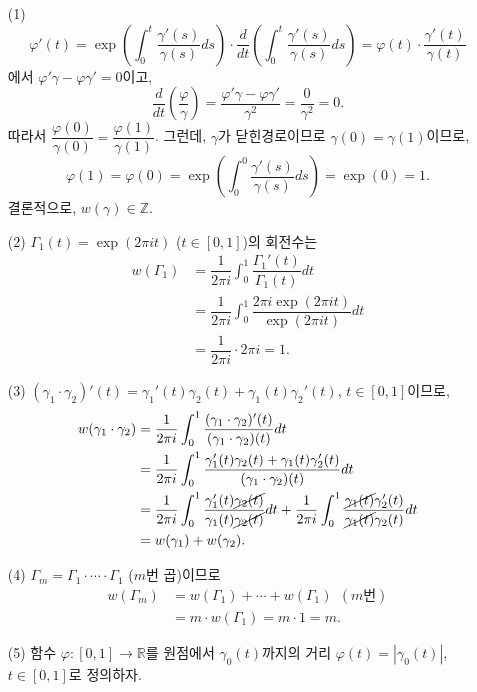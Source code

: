 \begin{itemize}
\item[(1)] 
\[
\varphi'(t) = \exp\left( \int_0^t \dfrac{\gamma'(s)}{\gamma(s)}ds \right)
\cdot \dfrac d{dt}\left( \int_0^t \dfrac{\gamma'(s)}{\gamma(s)}ds \right) 
= \varphi(t)\cdot \dfrac{\gamma'(t)}{\gamma(t)}
\]
에서 $\varphi'\gamma - \varphi\gamma' = 0$이고,
\[
\dfrac d{dt} \left( \dfrac\varphi \gamma \right) 
= \dfrac{\varphi'\gamma - \varphi\gamma'}{\gamma^2} = \dfrac0{\gamma^2} = 0.
\]
따라서 $\dfrac{\varphi(0)}{\gamma(0)}=\dfrac{\varphi(1)}{\gamma(1)}$.
그런데, $\gamma$가 닫힌경로이므로 $\gamma(0)=\gamma(1)$이므로,
\[
\varphi(1) = \varphi(0) = \exp\left( \int_0^0 \dfrac{\gamma'(s)}{\gamma(s)}ds \right)
= \exp(0) = 1.
\]
결론적으로, $w(\gamma) \in\mathbb Z$.
\item[(2)] $\Gamma_1(t) = \exp(2\pi i t)$ ($t\in[0,1]$)의 회전수는
\begin{align*}
w(\Gamma_1) &= \dfrac1{2\pi i} \int_0^1 \dfrac{\Gamma_1'(t)}{\Gamma_1(t)} dt \\
&=\dfrac1{2\pi i} \int_0^1 \dfrac{2\pi i\exp(2\pi i t)}{\exp(2\pi i t)}dt \\
&=\dfrac1{2\pi i} \cdot 2\pi i  = 1.
\end{align*}
\item[(3)]  $(\gamma_1\cdot\gamma_2)'(t) = \gamma_1'(t)\gamma_2(t) +
\gamma_1(t)\gamma_2'(t)$, $t\in[0,1]$이므로,
\begin{align*}
w(\gamma_1\cdot\gamma_2)
&= \dfrac1{2\pi i} 
\int_0^1 \dfrac{(\gamma_1\cdot\gamma_2)'(t)}{(\gamma_1\cdot\gamma_2)(t)}dt\\
&= \dfrac1{2\pi i} \int_0^1 \dfrac{\gamma_1'(t)\gamma_2(t) +\gamma_1(t)\gamma_2'(t)}
{(\gamma_1\cdot\gamma_2)(t)}dt \\
&= \dfrac1{2\pi i} \int_0^1 \dfrac{\gamma_1'(t) \cancel{\gamma_2(t)}}
{\gamma_1(t) \cancel{\gamma_2(t)}}dt 
+ \dfrac1{2\pi i} \int_0^1 \dfrac{\cancel{\gamma_1(t)}\gamma_2'(t)}
{\cancel{\gamma_1(t)}\gamma_2(t)}dt  \\
&= w(\gamma_1) + w(\gamma_2).
\end{align*}
\item[(4)] $\Gamma_m = \Gamma_1 \cdot\cdots\cdot \Gamma_1$ ($m$번 곱)이므로
\begin{align*}
w(\Gamma_m) &= w(\Gamma_1) + \cdots + w(\Gamma_1) \ \ (m\text{번}) \\
&= m\cdot w(\Gamma_1) = m\cdot 1 = m.
\end{align*}
\item[(5)] 함수 $\varphi:[0,1]\to \mathbb R$를 
원점에서 $\gamma_0(t)$까지의 거리 $\varphi(t) = |\gamma_0(t)|$, $t\in[0,1]$로 정의하자.

\end{itemize}
